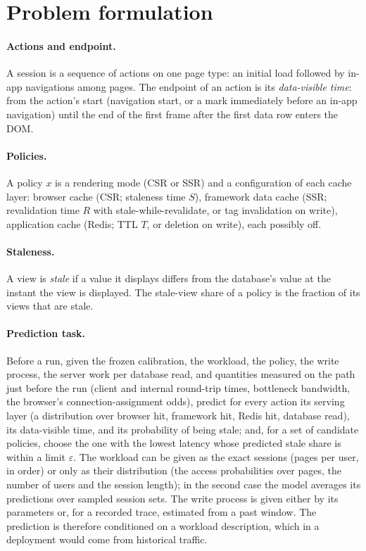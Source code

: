 \documentclass[acmsmall,review,nonacm]{acmart}
\begin{document}
\section{Problem formulation}
\label{sec:problem}

\paragraph{Actions and endpoint.} A session is a sequence of actions on one page type: an initial load followed by in-app navigations among pages. The endpoint of an action is its \emph{data-visible time}: from the action's start (navigation start, or a mark immediately before an in-app navigation) until the end of the first frame after the first data row enters the DOM.

\paragraph{Policies.} A policy $x$ is a rendering mode (CSR or SSR) and a configuration of each cache layer: browser cache (CSR; staleness time $S$), framework data cache (SSR; revalidation time $R$ with stale-while-revalidate, or tag invalidation on write), application cache (Redis; TTL $T$, or deletion on write), each possibly off.

\paragraph{Staleness.} A view is \emph{stale} if a value it displays differs from the database's value at the instant the view is displayed. The stale-view share of a policy is the fraction of its views that are stale.

\paragraph{Prediction task.} Before a run, given the frozen calibration, the workload, the policy, the write process, the server work per database read, and quantities measured on the path just before the run (client and internal round-trip times, bottleneck bandwidth, the browser's connection-assignment odds), predict for every action its serving layer (a distribution over browser hit, framework hit, Redis hit, database read), its data-visible time, and its probability of being stale; and, for a set of candidate policies, choose the one with the lowest latency whose predicted stale share is within a limit $\varepsilon$. The workload can be given as the exact sessions (pages per user, in order) or only as their distribution (the access probabilities over pages, the number of users and the session length); in the second case the model averages its predictions over sampled session sets. The write process is given either by its parameters or, for a recorded trace, estimated from a past window. The prediction is therefore conditioned on a workload description, which in a deployment would come from historical traffic.
\end{document}
